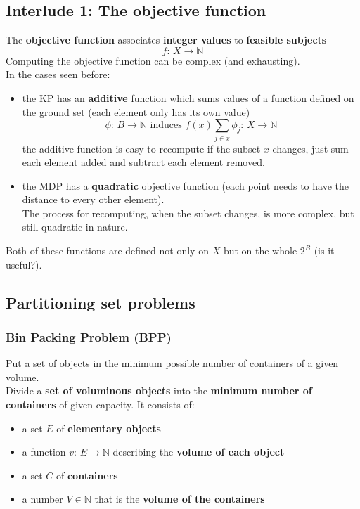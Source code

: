 \documentclass[11pt]{article}
\begin{document}
	\newpage
	
	\subsection*{Interlude 1: The objective function}
	The \textbf{objective function} associates \textbf{integer values} to \textbf{feasible subjects}
	$$ f: \, X \rightarrow \mathbb{N} $$
	Computing the objective function can be complex (and exhausting).\\
	
	In the cases seen before: 
	\begin{itemize}
		\item the KP has an \textbf{additive} function which sums values of a function defined on the ground set (each element only has its own value)
		$$ \phi : \, B \rightarrow \mathbb{N} \text{ induces } f(x) \sum_{j \in x} \phi_j : \, X \rightarrow \mathbb{N} $$
		the additive function is easy to recompute if the subset $x$ changes, just sum each element added and subtract each element removed.\\
		
		\item the MDP has a \textbf{quadratic} objective function (each point needs to have the distance to every other element). \\
		The process for recomputing, when the subset changes, is more complex, but still quadratic in nature.\\
	\end{itemize}
	Both of these functions are defined not only on $X$ but on the whole $2^B$ (is it useful?).\\
	
	\newpage
	
	\subsection{Partitioning set problems}
	\subsubsection{Bin Packing Problem (BPP)}
	Put a set of objects in the minimum possible number of containers of a given volume.\\ 
	Divide a \textbf{set of voluminous objects} into the \textbf{minimum number of containers} of given capacity. It consists of:
	\begin{itemize}
		\item a set $E$ of \textbf{elementary objects}
		\item a function $v: \, E \rightarrow \mathbb{N}$ describing the \textbf{volume of each object}
		\item a set $C$ of \textbf{containers}
		\item a number $V \in \mathbb{N}$ that is the \textbf{volume of the containers}
	\end{itemize}
	
\end{document}
